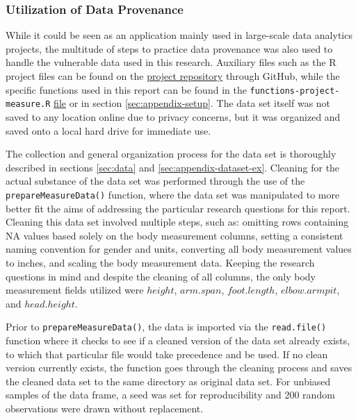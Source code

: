 \documentclass[]{article}
\begin{document}
\subsubsection{Utilization of Data Provenance}
\label{sec:appendix-provenance-explained}

While it could be seen as an application mainly used in large-scale data
analytics projects, the multitude of steps to practice data provenance
was also used to handle the vulnerable data used in this research.
Auxiliary files such as the R project files can be found on the
\href{https://github.com/KevnBlack/WSU_STATS419_FALL2020/tree/master/PROJECT-01}{project repository}
through GitHub, while the specific functions used in this report can be
found in the \texttt{functions-project-measure.R}
\href{https://raw.githubusercontent.com/KevnBlack/WSU_STATS419_FALL2020/master/functions/functions-project-measure.R}{file}
or in section \ref{sec:appendix-setup}. The data set itself was not
saved to any location online due to privacy concerns, but it was
organized and saved onto a local hard drive for immediate use.

\vspace{0.25cm}

The collection and general organization process for the data set is
thoroughly described in sections \ref{sec:data} and
\ref{sec:appendix-dataset-ex}. Cleaning for the actual substance of the
data set was performed through the use of the
\texttt{prepareMeasureData()} function, where the data set was
manipulated to more better fit the aims of addressing the particular
research questions for this report. Cleaning this data set involved
multiple steps, such as: omitting rows containing NA values based solely
on the body measurement columns, setting a consistent naming convention
for gender and units, converting all body measurement values to inches,
and scaling the body measurement data. Keeping the research questions in
mind and despite the cleaning of all columns, the only body measurement
fields utilized were \(height\), \(arm.span\), \(foot.length\),
\(elbow.armpit\), and \(head.height\).

\vspace{0.25cm}

Prior to \texttt{prepareMeasureData()}, the data is imported via the
\texttt{read.file()} function where it checks to see if a cleaned
version of the data set already exists, to which that particular file
would take precedence and be used. If no clean version currently exists,
the function goes through the cleaning process and saves the cleaned
data set to the same directory as original data set. For unbiased
samples of the data frame, a seed was set for reproducibility and 200
random observations were drawn without replacement.
\end{document}
